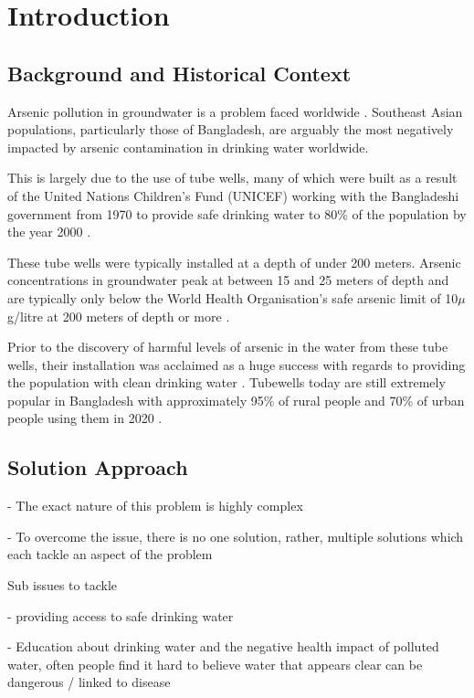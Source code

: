 \chapter{Introduction}

\section{Background and Historical Context}

Arsenic pollution in groundwater is a problem faced worldwide \parencite{khan2014groundwater}. Southeast Asian populations, particularly those of Bangladesh, are arguably the most negatively impacted by arsenic contamination in drinking water worldwide. 

This is largely due to the use of tube wells, many of which were built as a result of the United Nations Children's Fund (UNICEF) working with the Bangladeshi government from 1970 to provide safe drinking water to 80\% of the population by the year 2000 \parencite{Smith2000}. 

These tube wells were typically installed at a depth of under 200 meters. Arsenic concentrations in groundwater peak at between 15 and 25 meters of depth and are typically only below the World Health Organisation's safe arsenic limit of 10$\mu$g/litre \parencite{WHO2003} at 200 meters of depth or more \parencite{Chakraborti2010}. 

Prior to the discovery of harmful levels of arsenic in the water from these tube wells, their installation was acclaimed as a huge success with regards to providing the population with clean drinking water \parencite{khan2014groundwater}. Tubewells today are still extremely popular in Bangladesh with approximately 95\% of rural people and 70\% of urban people using them in 2020 \parencite{Ghosh2020}.

\section{Solution Approach}

- The exact nature of this problem is highly complex

- To overcome the issue, there is no one solution, rather, multiple solutions which each tackle an aspect of the problem

Sub issues to tackle

- providing access to safe drinking water

- Education about drinking water and the negative health impact of polluted water, often people find it hard to believe water that appears clear can be dangerous / linked to disease

